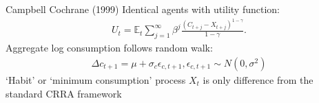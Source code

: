 \documentclass[xcolor=table, aspectratio=169]{beamer}
\newcommand{\E}{\mathbb{E}}
\newcommand{\alertbf}[1]{\alert{\textbf{#1}}}
\begin{document}
\begin{frame}{Campbell Cochrane (1999)}
Identical agents with utility function:
\begin{align*}
U_t = \E_t \sum_{j=1}^\infty \beta^j \frac{(C_{t+j}-X_{t+j})^{1-\gamma}}{1-\gamma}.
\end{align*}
Aggregate log consumption follows random walk:
\begin{align*}
\Delta c_{t+1} = \mu + \sigma_c \epsilon_{c,t+1},
\epsilon_{c,t+1} \sim N(0,\sigma^2)
\end{align*}
\vskip 12pt
`Habit' or `minimum consumption' process $X_t$ is only difference from the standard CRRA framework
\end{frame}





\end{document}
